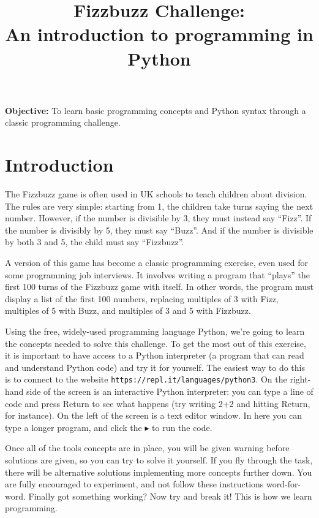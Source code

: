 \documentclass[a4paper]{article}
\title{Fizzbuzz Challenge:\\An introduction to programming in Python}
\date{}
\begin{document}
\maketitle
\begin{center}
	\textbf{Objective:} To learn basic programming concepts and Python syntax through a classic programming challenge.
\end{center}
\section{Introduction}

The Fizzbuzz game is often used in UK schools to teach children about division. The rules are very simple: starting from 1, the children take turns saying the next number. However, if the number is divisible by 3, they must instead say ``Fizz''. If the number is divisibly by 5, they must say ``Buzz''. And if the number is divisible by both 3 and 5, the child must say ``Fizzbuzz''.

A version of this game has become a classic programming exercise, even used for some programming job interviews. It involves writing a program that ``plays'' the first 100 turns of the Fizzbuzz game with itself. In other words, the program must display a list of the first 100 numbers, replacing multiples of 3 with Fizz, multiples of 5 with Buzz, and multiples of 3 and 5 with Fizzbuzz.

Using the free, widely-used programming language Python, we're going to learn the concepts needed to solve this challenge. To get the most out of this exercise, it is important to have access to a Python interpreter (a program that can read and understand Python code) and try it for yourself. The easiest way to do this is to connect to the website \verb|https://repl.it/languages/python3|. On the right-hand side of the screen is an interactive Python interpreter: you can type a line of code and press Return to see what happens (try writing 2+2 and hitting Return, for instance). On the left of the screen is a text editor window. In here you can type a longer program, and click the $\blacktriangleright$ to run the code.

Once all of the tools concepts are in place, you will be given warning before solutions are given, so you can try to solve it yourself. If you fly through the task, there will be alternative solutions implementing more concepts further down. You are fully encouraged to experiment, and not follow these instructions word-for-word. Finally got something working? Now try and break it! This is how we learn programming.
\end{document}
